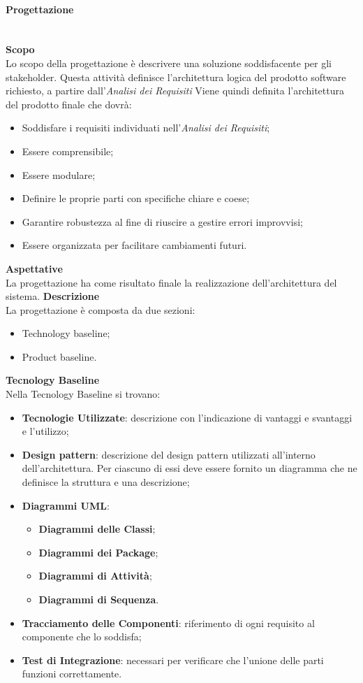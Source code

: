 \paragraph{Progettazione}\mbox{}\\ [1mm]
\textbf{Scopo}\\
Lo scopo della progettazione è descrivere una soluzione soddisfacente per gli stakeholder\glo. Questa attività definisce l'architettura logica del prodotto software richiesto, a partire dall'\textit{Analisi dei Requisiti}
Viene quindi definita l'architettura del prodotto finale che dovrà:
\begin{itemize}
	\item Soddisfare i requisiti individuati nell'\textit{Analisi dei Requisiti};
	\item Essere comprensibile;
	\item Essere modulare;
	\item Definire le proprie parti con specifiche chiare e coese;
	\item Garantire robustezza al fine di riuscire a gestire errori improvvisi;
	\item Essere organizzata per facilitare cambiamenti futuri.
\end{itemize}
\textbf{Aspettative}\\
La progettazione ha come risultato finale la realizzazione dell'architettura del sistema.
\textbf{Descrizione}\\
La progettazione è composta da due sezioni:
\begin{itemize}
	\item Technology baseline;
	\item Product baseline.	
\end{itemize}
\textbf{Tecnology Baseline}\\
Nella Tecnology Baseline si trovano:
\begin{itemize}
	\item \textbf{Tecnologie Utilizzate}: descrizione con l'indicazione di vantaggi e svantaggi e l'utilizzo;
	\item \textbf{Design pattern\glo}: descrizione del design pattern utilizzati all'interno dell'architettura. Per ciascuno di essi deve essere fornito un diagramma che ne definisce la struttura e una descrizione;
	\item \textbf{Diagrammi UML}:
	\begin{itemize}
		\item \textbf{Diagrammi delle Classi};
		\item \textbf{Diagrammi dei Package};
		\item \textbf{Diagrammi di Attività};
		\item \textbf{Diagrammi di Sequenza}.
	\end{itemize}
	\item \textbf{Tracciamento delle Componenti}: riferimento di ogni requisito al componente che lo soddisfa;
	\item \textbf{Test di Integrazione}: necessari per verificare che l'unione delle parti funzioni correttamente.
\end{itemize}
